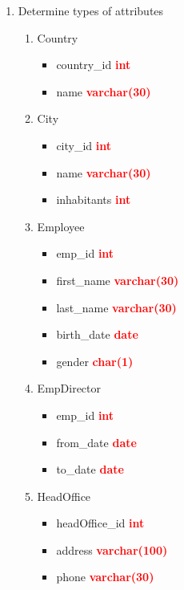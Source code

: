 \documentclass[]{article}
\begin{document}
\begin{enumerate}
\item Determine types of attributes

\begin{enumerate}
\item Country
\begin{itemize}
\item country\_id \textcolor{red}{\textbf{int}}
\item name \textcolor{red}{\textbf{varchar(30)}}
\end{itemize}

\item City
\begin{itemize}
\item city\_id \textcolor{red}{\textbf{int}}
\item name \textcolor{red}{\textbf{varchar(30)}}
\item inhabitants \textcolor{red}{\textbf{int}}
\end{itemize}

\item Employee
\begin{itemize}
\item emp\_id \textcolor{red}{\textbf{int}}
\item first\_name \textcolor{red}{\textbf{varchar(30)}}
\item last\_name \textcolor{red}{\textbf{varchar(30)}}
\item birth\_date \textcolor{red}{\textbf{date}}
\item gender \textcolor{red}{\textbf{char(1)}}
\end{itemize}

\item EmpDirector
\begin{itemize}
\item emp\_id \textcolor{red}{\textbf{int}}
\item from\_date \textcolor{red}{\textbf{date}}
\item to\_date \textcolor{red}{\textbf{date}}
\end{itemize}

\item HeadOffice
\begin{itemize}
\item headOffice\_id \textcolor{red}{\textbf{int}}
\item address \textcolor{red}{\textbf{varchar(100)}}
\item phone	\textcolor{red}{\textbf{varchar(30)}}
\end{itemize}


\end{enumerate}
\end{enumerate}
\end{document}
